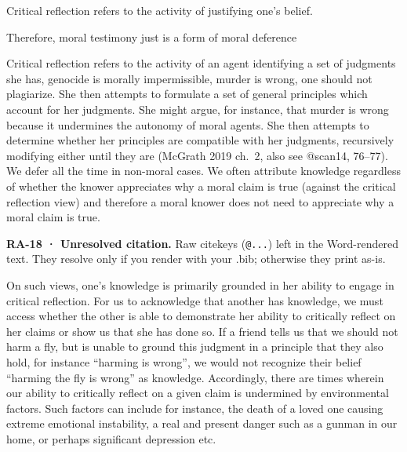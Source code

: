 \documentclass[
  letterpaper,
  DIV=11,
  numbers=noendperiod]{scrartcl}
\theoremstyle{remark}
\begin{document}
Critical reflection refers to the activity of justifying one's belief.

Therefore, moral testimony just is a form of moral deference

Critical reflection refers to the activity of an agent identifying a set
of judgments she has, genocide is morally impermissible, murder is
wrong, one should not plagiarize. She then attempts to formulate a set
of general principles which account for her judgments. She might argue,
for instance, that murder is wrong because it undermines the autonomy of
moral agents. She then attempts to determine whether her principles are
compatible with her judgments, recursively modifying either until they
are (McGrath 2019 ch.~2, also see @scan14, 76--77). We defer all the
time in non-moral cases. We often attribute knowledge regardless of
whether the knower appreciates why a moral claim is true (against the
critical reflection view) and therefore a moral knower does not need to
appreciate why a moral claim is true.

\begin{tcolorbox}[enhanced jigsaw, arc=.35mm, bottomrule=.15mm, bottomtitle=1mm, breakable, colback=white, colbacktitle=quarto-callout-warning-color!10!white, colframe=quarto-callout-warning-color-frame, coltitle=black, left=2mm, leftrule=.75mm, opacityback=0, opacitybacktitle=0.6, rightrule=.15mm, title=\textcolor{quarto-callout-warning-color}{\faExclamationTriangle}\hspace{0.5em}{Warning}, titlerule=0mm, toprule=.15mm, toptitle=1mm]

\textbf{RA-18 · Unresolved citation.} Raw citekeys (\texttt{@...}) left
in the Word-rendered text. They resolve only if you render with your
.bib; otherwise they print as-is.

\end{tcolorbox}

On such views, one's knowledge is primarily grounded in her ability to
engage in critical reflection. For us to acknowledge that another has
knowledge, we must access whether the other is able to demonstrate her
ability to critically reflect on her claims or show us that she has done
so. If a friend tells us that we should not harm a fly, but is unable to
ground this judgment in a principle that they also hold, for instance
``harming is wrong'', we would not recognize their belief ``harming the
fly is wrong'' as knowledge. Accordingly, there are times wherein our
ability to critically reflect on a given claim is undermined by
environmental factors. Such factors can include for instance, the death
of a loved one causing extreme emotional instability, a real and present
danger such as a gunman in our home, or perhaps significant depression
etc.
\end{document}
